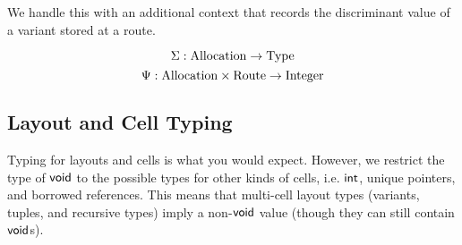 We handle this with an additional context that records the discriminant value
of a variant stored at a route. 

$$ \Sigma : \mathrm{Allocation} \to \mathrm{Type}$$
$$ \Psi : \mathrm{Allocation} \times \mathrm{Route} \to \mathrm{Integer} $$



\subsection*{Layout and Cell Typing}
Typing for layouts and cells is what you would expect.
However, we restrict the type of $\mathsf{void}$ to the possible types for other
kinds of cells, i.e. $\mathsf{int}$, unique pointers, and borrowed references.
This means that multi-cell layout types (variants, tuples, and recursive types) imply
a non-$\mathsf{void}$ value (though they can still contain $\mathsf{void}$s).
\newline



